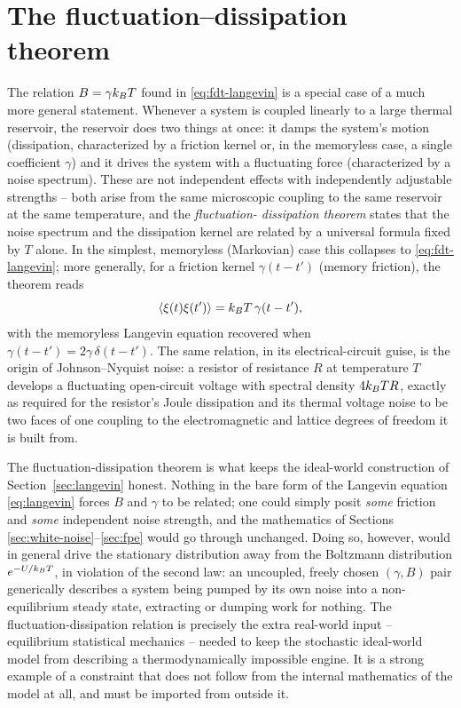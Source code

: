 \section{The fluctuation--dissipation theorem}
\label{sec:fdt}

The relation $B = \gamma k_{B} T$ found in \eqref{eq:fdt-langevin} is a
special case of a much more general statement. Whenever a system is
coupled linearly to a large thermal reservoir, the reservoir does two
things at once: it damps the system's motion (dissipation, characterized
by a friction kernel or, in the memoryless case, a single coefficient
$\gamma$) and it drives the system with a fluctuating force (characterized
by a noise spectrum). These are not independent effects with independently
adjustable strengths -- both arise from the same microscopic coupling to
the same reservoir at the same temperature, and the \emph{fluctuation-
dissipation theorem} states that the noise spectrum and the dissipation
kernel are related by a universal formula fixed by $T$ alone. In the
simplest, memoryless (Markovian) case this collapses to
\eqref{eq:fdt-langevin}; more generally, for a friction kernel
$\gamma(t-t')$ (memory friction), the theorem reads
\begin{equation}
\left\langle \xi(t)\xi(t') \right\rangle = k_{B} T\,\gamma(t-t'),
\end{equation}
with the memoryless Langevin equation recovered when $\gamma(t-t') =
2\gamma\,\delta(t-t')$. The same relation, in its electrical-circuit guise,
is the origin of Johnson--Nyquist noise: a resistor of resistance $R$ at
temperature $T$ develops a fluctuating open-circuit voltage with spectral
density $4k_{B} T R$, exactly as required for the resistor's Joule
dissipation and its thermal voltage noise to be two faces of one coupling
to the electromagnetic and lattice degrees of freedom it is built from.

\begin{remark}
The fluctuation-dissipation theorem is what keeps the ideal-world
construction of Section~\ref{sec:langevin} honest. Nothing in the bare
form of the Langevin equation \eqref{eq:langevin} forces $B$ and $\gamma$
to be related; one could simply posit \emph{some} friction and \emph{some}
independent noise strength, and the mathematics of Sections
\ref{sec:white-noise}--\ref{sec:fpe} would go through unchanged. Doing so,
however, would in general drive the stationary distribution away from the
Boltzmann distribution $e^{-U/k_{B} T}$, in violation of the second law: an
uncoupled, freely chosen $(\gamma,B)$ pair generically describes a system
being pumped by its own noise into a non-equilibrium steady state,
extracting or dumping work for nothing. The fluctuation-dissipation
relation is precisely the extra real-world input -- equilibrium
statistical mechanics -- needed to keep the stochastic ideal-world model
from describing a thermodynamically impossible engine. It is a strong
example of a constraint that does not follow from the internal mathematics
of the model at all, and must be imported from outside it.
\end{remark}

